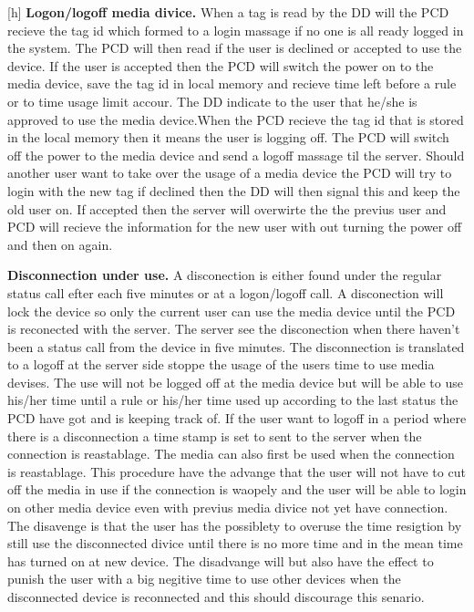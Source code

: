\begin{center}[h]
\textbf{Logon/logoff media divice.} \newline
When a tag is read by the DD will the PCD recieve the tag id which formed to a login massage if no one is all ready logged in the system. The PCD will then read if the user is declined or accepted to use the device. If the user is accepted then the PCD will switch the power on to the media device, save the tag id in local memory and recieve time left before a rule or to time usage limit accour. The DD indicate to the user that he/she is approved to use the media device.\newline When the PCD recieve the tag id that is stored in the local memory then it means the user is logging off. The PCD will switch off the power to the media device and send a logoff massage til the server. Should another user want to take over the usage of a media device the PCD will try to login with the new tag if declined then the DD will then signal this and keep the old user on. If accepted then the server will overwirte the the previus user and PCD will recieve the information for the new user with out turning the power off and then on again.\newline


\textbf{Disconnection under use.} \newline
A disconection is either found under the regular status call efter each five minutes or at a logon/logoff call. A disconection will lock the device so only the current user can use the media device until the PCD is reconected with the server. The server see the disconection when there haven't been a status call from the device in five minutes. The disconnection is translated to a logoff at the server side stoppe the usage of the users time to use media devises. The use will not be logged off at the media device but will be able to use his/her time until a rule or his/her time used up according to the last status the PCD have got and is keeping track of. If the user want to logoff in a period where there is a disconnection a time stamp is set to sent to the server when the connection is reastablage. The media can also first be used when the connection is reastablage.   
This procedure have the advange that the user will not have to cut off the media in use if the connection is waopely and the user will be able to login on other media device even with previus media divice not yet have connection. 
The disavenge is that the user has the possiblety to overuse the time resigtion by still use the disconnected divice until there is no more time and in the mean time has turned on at new device. 
The disadvange will but also have the effect to punish the user with a big negitive time to use other devices when the disconnected device is reconnected and this should discourage this senario.       
    

\end{center}
